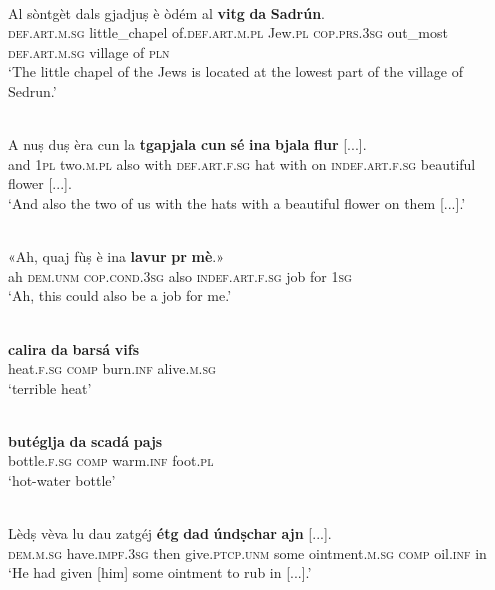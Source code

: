 \ea
{}\\
\gll Al sòntgèt dals gjadjuṣ è òdém al \textbf{vitg} \textbf{da} \textbf{Sadrún}.\\
\textsc{def.art.m.sg} little\_chapel of.\textsc{def.art.m.pl} Jew.\textsc{pl} \textsc{cop.prs.3sg}  out\_most \textsc{def.art.m.sg} village of \textsc{pln} \\
\glt `The little chapel of the Jews is located at the lowest part of the village of Sedrun.'
\z


\ea
{}\\
	\gll    A nuṣ duṣ èra cun la \textbf{tgapjala} \textbf{cun} \textbf{sé} \textbf{ina} \textbf{bjala} \textbf{flur} [...].\\
and \textsc{1pl} two.\textsc{m.pl} also with \textsc{def.art.f.sg} hat with on \textsc{indef.art.f.sg} beautiful flower [...].\\
\glt `And also the two of us with the hats with a beautiful flower on them [...].'
\z

\ea
{}\\
	\gll «Ah, quaj fùṣ è ina \textbf{lavur} \textbf{pr} \textbf{mè}.»\\
	ah \textsc{dem.unm} \textsc{cop.cond.3sg} also \textsc{indef.art.f.sg} job for \textsc{1sg} \\
\glt `Ah, this could also be a job for me.'
\z

\ea
{}\\
\gll  \textbf{calira} \textbf{da} \textbf{barsá} \textbf{vifs} \\
heat.\textsc{f.sg} \textsc{comp} burn.\textsc{inf} alive.\textsc{m.sg}\\
\glt `terrible heat'
\z

\ea
{}\\
\gll   \textbf{butéglja} \textbf{da} \textbf{scadá} \textbf{pajs} \\
bottle.\textsc{f.sg} \textsc{comp} warm.\textsc{inf} foot.\textsc{pl} \\
\glt `hot-water bottle'
\z

\ea

\\
\gll  Lèdṣ vèva lu dau zatgéj \textbf{étg} \textbf{dad} \textbf{úndṣchar} \textbf{ajn} [...]. \\
\textsc{dem.m.sg} have.\textsc{impf.3sg} then  give.\textsc{ptcp.unm} some ointment.\textsc{m.sg} \textsc{comp} oil.\textsc{inf} in\\
\glt `He had given [him] some ointment to rub in [...].'
\z

